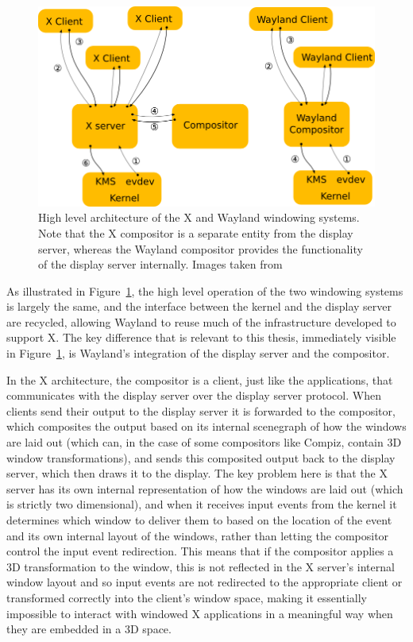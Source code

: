 \begin{figure}[ht!]
\centering
\includegraphics[width=1.0\textwidth]{images/wayland-x-architecture.png}
\caption{High level architecture of the X and Wayland windowing systems. Note that the X compositor is a separate entity from the display server, whereas the Wayland compositor provides the functionality of the display server internally. Images taken from  \protect\cite{wayland}}
\label{fig:wayland-vs-x}
\end{figure}



As illustrated in Figure~\ref{fig:wayland-vs-x}, the high level operation of the two windowing systems is largely the same, and the interface between the kernel and the display server are recycled, allowing Wayland to reuse much of the infrastructure developed to support X. The key difference that is relevant to this thesis, immediately visible in Figure~\ref{fig:wayland-vs-x}, is Wayland’s integration of the display server and the compositor. 

In the X architecture, the compositor is a client, just like the applications, that communicates with the display server over the display server protocol. When clients send their output to the display server it is forwarded to the compositor, which composites the output based on its internal scenegraph of how the windows are laid out (which can, in the case of some compositors like Compiz, contain 3D window transformations), and sends this composited output back to the display server, which then draws it to the display. The key problem here is that the X server has its own internal representation of how the windows are laid out (which is strictly two dimensional), and when it receives input events from the kernel it  determines which window to deliver them to based on the location of the event and its own internal layout of the windows, rather than letting the compositor control the input event redirection. This means that if the compositor applies a 3D transformation to the window, this is not reflected in the X server’s internal window layout and so input events are not redirected to the appropriate client or transformed correctly into the client’s window space, making it essentially impossible to interact with windowed X applications in a meaningful way when they are embedded in a 3D space. 

